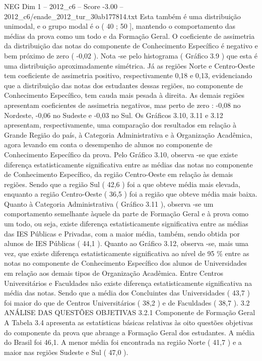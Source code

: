 \begin{textsample}{NEG Dim 1 – 2012\_c6 – Score -3.00 – 2012\_c6/enade\_2012\_tur\_30ab177814.txt}
Esta também é uma distribuição unimodal, e o grupo modal é o ( 40 ; 50 ], mantendo o comportamento das médias da prova como um todo e da Formação Geral.
O coeficiente de assimetria da distribuição das notas do componente de Conhecimento Específico é negativo e bem próximo de zero ( -0,02 ).
Nota -se pelo histograma ( Gráfico 3.9 ) que esta é uma distribuição aproximadamente simétrica.
Já as regiões Norte e Centro-Oeste tem coeficiente de assimetria positivo, respectivamente 0,18 e 0,13, evidenciando que a distribuição das notas dos estudantes dessas regiões, no componente de Conhecimento Específico, tem cauda mais pesada à direita.
As demais regiões apresentam coeficientes de assimetria negativos, mas perto de zero : -0,08 no Nordeste, -0,06 no Sudeste e -0,03 no Sul.
Os Gráficos 3.10, 3.11 e 3.12 apresentam, respectivamente, uma comparação dos resultados em relação à Grande Região do país, à Categoria Administrativa e à Organização Acadêmica, agora levando em conta o desempenho de alunos no componente de Conhecimento Específico da prova.
Pelo Gráfico 3.10, observa -se que existe diferença estatisticamente significativa entre as médias das notas no componente de Conhecimento Específico, da região Centro-Oeste em relação às demais regiões.
Sendo que a região Sul ( 42,6 ) foi a que obteve média mais elevada, enquanto a região Centro-Oeste ( 36,5 ) foi a região que obteve média mais baixa.
Quanto à Categoria Administrativa ( Gráfico 3.11 ), observa -se um comportamento semelhante àquele da parte de Formação Geral e à prova como um todo, ou seja, existe diferença estatisticamente significativa entre as médias das IES Públicas e Privadas, com a maior média, também, sendo obtida por alunos de IES Públicas ( 44,1 ).
Quanto ao Gráfico 3.12, observa -se, mais uma vez, que existe diferença estatisticamente significativa ao nível de 95 \% entre as notas no componente de Conhecimento Específico dos alunos de Universidades em relação aos demais tipos de Organização Acadêmica.
Entre Centros Universitários e Faculdades não existe diferença estatisticamente significativa na média das notas.
Sendo que a média dos Concluintes das Universidades ( 43,7 ) foi maior do que de Centros Universitários ( 38,2 ) e de Faculdades ( 38,7 ). 3.2 ANÁLISE DAS QUESTÕES OBJETIVAS 3.2.1 Componente de Formação Geral A Tabela 3.4 apresenta as estatísticas básicas relativas às oito questões objetivas do componente da prova que abrange a Formação Geral dos estudantes.
A média do Brasil foi 46,1.
A menor média foi encontrada na região Norte ( 41,7 ) e a maior nas regiões Sudeste e Sul ( 47,0 ).

\end{textsample}
